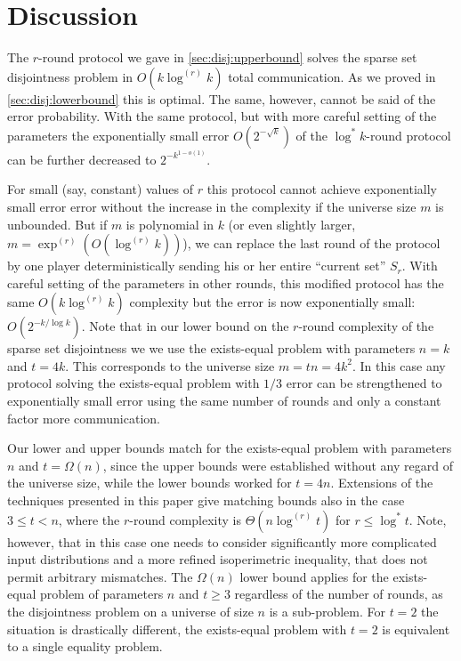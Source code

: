 \section{Discussion}
\label{sec:disj:discussion}
The $r$-round protocol we gave in \autoref{sec:disj:upperbound}
solves the sparse set disjointness problem in $O(k\log^{(r)}k)$
total communication. As we proved in \autoref{sec:disj:lowerbound}
this is optimal. The same, however, cannot be said of the error
probability. With the same protocol, but with more careful
setting of the parameters the exponentially small error
$O(2^{-\sqrt k})$ of the $\log^*k$-round protocol can be further
decreased to $2^{-k^{1-o(1)}}$.

For small (say, constant) values of $r$ this protocol cannot
achieve exponentially small error error without the increase in
the complexity if the universe size $m$ is unbounded. But if $m$
is polynomial in $k$ (or even slightly larger,
$m=\exp^{(r)}(O(\log^{(r)}k))$), we can replace the last round
of the protocol by one player deterministically sending his or
her entire ``current set'' $S_r$. With careful setting of the
parameters in other rounds, this modified protocol has the same
$O(k\log^{(r)}k)$ complexity but the error is now exponentially
small: $O(2^{-k/\log k})$. Note that in our lower bound on the
$r$-round complexity of the sparse set disjointness we we use
the exists-equal problem with parameters $n=k$ and $t=4k$. This
corresponds to the universe size $m=tn=4k^2$. In this case any
protocol solving the exists-equal problem with $1/3$ error can
be strengthened to exponentially small error using the same
number of rounds and only a constant factor more communication.

Our lower and upper bounds match for the exists-equal problem
with parameters $n$ and $t=\Omega(n)$, since the upper bounds
were established without any regard of the universe size, while
the lower bounds worked for $t=4n$. Extensions of the techniques
presented in this paper give matching bounds also in the case
$3\le t<n$, where the $r$-round complexity is
$\Theta(n\log^{(r)}t)$ for $r\le\log^*t$. Note, however, that in
this case one needs to consider significantly more complicated
input distributions and a more refined isoperimetric inequality,
that does not permit arbitrary mismatches. The $\Omega(n)$ lower
bound applies for the exists-equal problem of parameters $n$ and
$t\ge3$ regardless of the number of rounds, as the disjointness
problem on a universe of size $n$ is a sub-problem. For $t=2$
the situation is drastically different, the exists-equal problem
with $t=2$ is equivalent to a single equality problem.

